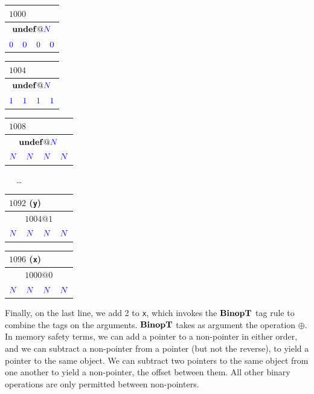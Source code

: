 \documentclass[acmsmall,review,anonymous]{acmart}\settopmatter{printfolios=true,printccs=false,printacmref=false}
\begin{document}
\begin{tabular}{|c|c|c|c|}
  \multicolumn{4}{l}{\(1000\)} \\
  \hline
  \multicolumn{4}{|c|}{\(\mathbf{undef} @ {\color{blue} N}\)} \\
  \hline
  \({\color{blue} 0}\) & \({\color{blue} 0}\) & \({\color{blue} 0}\) & \({\color{blue} 0}\) \\
  \hline
\end{tabular}\hspace{-2pt}
\begin{tabular}{|c|c|c|c|}
  \multicolumn{4}{l}{\(1004\)} \\
  \hline
  \multicolumn{4}{|c|}{\(\mathbf{undef} @ {\color{blue} N}\)} \\
  \hline
  \({\color{blue} 1}\) & \({\color{blue} 1}\) & \({\color{blue} 1}\) & \({\color{blue} 1}\) \\
  \hline
\end{tabular}\hspace{-2pt}
\begin{tabular}{|c|c|c|c|}
  \multicolumn{4}{l}{\(1008\)} \\
  \hline
  \multicolumn{4}{|c|}{\(\mathbf{undef} @ {\color{blue} N}\)} \\
  \hline
  \footnotesize \({\color{blue} N}\) & \footnotesize \({\color{blue} N}\) & \footnotesize \({\color{blue} N}\) & \footnotesize \({\color{blue} N}\) \\
  \hline
\end{tabular}~ ~\dots~ ~
\begin{tabular}{|c|c|c|c|}
  \multicolumn{4}{l}{\(1092\) ({\tt y})} \\
  \hline
  \multicolumn{4}{|c|}{\(1004 @ 1\)} \\
  \hline
  \footnotesize \({\color{blue} N}\) & \footnotesize \({\color{blue} N}\) & \footnotesize \({\color{blue} N}\) & \footnotesize \({\color{blue} N}\) \\
  \hline
\end{tabular}\hspace{-2pt}
\begin{tabular}{|c|c|c|c|}
  \multicolumn{4}{l}{\(1096\) ({\tt x})} \\
  \hline
  \multicolumn{4}{|c|}{\(1000 @ 0\)} \\
  \hline
  \footnotesize \({\color{blue} N}\) & \footnotesize \({\color{blue} N}\) & \footnotesize \({\color{blue} N}\) & \footnotesize \({\color{blue} N}\) \\
  \hline
\end{tabular}

\vspace{\belowdisplayskip}

Finally, on the last line, we add 2 to {\tt x}, which invokes the \(\mathbf{BinopT}\) tag rule
to combine the tags on the arguments. \(\mathbf{BinopT}\) takes as argument the operation \(\oplus\).
In memory safety terms, we can add a pointer to a non-pointer in either order, and we can subtract
a non-pointer from a pointer (but not the reverse), to yield a pointer to the same object. We can
subtract two pointers to the same object from one another to yield a non-pointer, the offset between them.
All other binary operations are only permitted between non-pointers.
\end{document}
